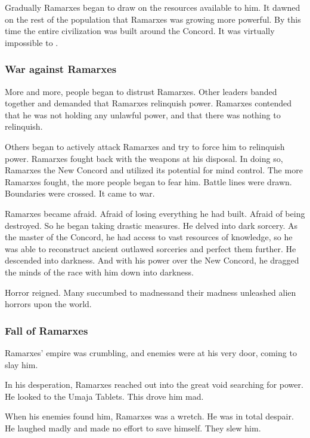 Gradually Ramarxes began to draw on the resources available to him.
It dawned on the rest of the population that Ramarxes was growing more powerful.
By this time the entire \caisith civilization was built around the Concord.
It was virtually impossible to . 





\subsubsection{War against Ramarxes}
More and more, people began to distrust Ramarxes. 
Other leaders banded together and demanded that Ramarxes relinquish power.
Ramarxes contended that he was not holding any unlawful power, and that there was nothing to relinquish.

Others began to actively attack Ramarxes and try to force him to relinquish power.
Ramarxes fought back with the weapons at his disposal. 
In doing so, Ramarxes  the New Concord and utilized its potential for mind control. 
The more Ramarxes fought, the more people began to fear him.
Battle lines were drawn. 
Boundaries were crossed.
It came to war. 

Ramarxes became afraid. 
Afraid of losing everything he had built.
Afraid of being destroyed. 
So he began taking drastic measures.
He delved into dark sorcery. 
As the master of the Concord, he had access to vast resources of knowledge, so he was able to reconstruct ancient outlawed sorceries and perfect them further. 
He descended into darkness. 
And with his power over the New Concord, he dragged the minds of the \caisith race with him down into darkness. 

Horror reigned. 
Many \ophidians succumbed to madness\dash and their madness unleashed alien horrors upon the world. 





\subsubsection{Fall of Ramarxes}
Ramarxes' empire was crumbling, and enemies were at his very door, coming to slay him. 

In his desperation, Ramarxes reached out into the great void searching for power.
He looked to the Umaja Tablets. 
This drove him mad. 

When his enemies found him, Ramarxes was a wretch. 
He was in total despair. 
He laughed madly and made no effort to save himself. 
They slew him. 





